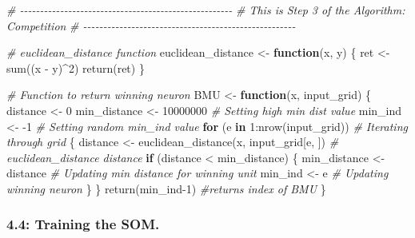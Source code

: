 \documentclass[
]{article}
\newenvironment{Shaded}{\begin{snugshade}}{\end{snugshade}}
\newcommand{\CommentTok}[1]{\textcolor[rgb]{0.56,0.35,0.01}{\textit{#1}}}
\newcommand{\ControlFlowTok}[1]{\textcolor[rgb]{0.13,0.29,0.53}{\textbf{#1}}}
\newcommand{\DecValTok}[1]{\textcolor[rgb]{0.00,0.00,0.81}{#1}}
\newcommand{\FunctionTok}[1]{\textcolor[rgb]{0.00,0.00,0.00}{#1}}
\newcommand{\NormalTok}[1]{#1}
\newcommand{\OtherTok}[1]{\textcolor[rgb]{0.56,0.35,0.01}{#1}}
\newcommand{\SpecialCharTok}[1]{\textcolor[rgb]{0.00,0.00,0.00}{#1}}
\begin{document}
\begin{Shaded}
\begin{Highlighting}[]
\CommentTok{\# {-}{-}{-}{-}{-}{-}{-}{-}{-}{-}{-}{-}{-}{-}{-}{-}{-}{-}{-}{-}{-}{-}{-}{-}{-}{-}{-}{-}{-}{-}{-}{-}{-}{-}{-}{-}{-}{-}{-}{-}{-}{-}{-}{-}{-}{-}{-}{-}{-}{-}{-}{-}{-}}
\CommentTok{\# This is Step 3 of the Algorithm: Competition}
\CommentTok{\# {-}{-}{-}{-}{-}{-}{-}{-}{-}{-}{-}{-}{-}{-}{-}{-}{-}{-}{-}{-}{-}{-}{-}{-}{-}{-}{-}{-}{-}{-}{-}{-}{-}{-}{-}{-}{-}{-}{-}{-}{-}{-}{-}{-}{-}{-}{-}{-}{-}{-}{-}{-}{-}}

\CommentTok{\# euclidean\_distance function}
\NormalTok{euclidean\_distance }\OtherTok{\textless{}{-}} \ControlFlowTok{function}\NormalTok{(x, y) \{}
\NormalTok{  ret }\OtherTok{\textless{}{-}} \FunctionTok{sum}\NormalTok{((x }\SpecialCharTok{{-}}\NormalTok{ y)}\SpecialCharTok{\^{}}\DecValTok{2}\NormalTok{)}
  \FunctionTok{return}\NormalTok{(ret)}
\NormalTok{\}}

\CommentTok{\# Function to return winning neuron}
\NormalTok{BMU }\OtherTok{\textless{}{-}} \ControlFlowTok{function}\NormalTok{(x, input\_grid) \{ }
\NormalTok{  distance }\OtherTok{\textless{}{-}} \DecValTok{0}
\NormalTok{  min\_distance }\OtherTok{\textless{}{-}} \DecValTok{10000000} \CommentTok{\# Setting high min dist value}
\NormalTok{  min\_ind }\OtherTok{\textless{}{-}} \SpecialCharTok{{-}}\DecValTok{1} \CommentTok{\# Setting random min\_ind value}
  \ControlFlowTok{for}\NormalTok{ (e }\ControlFlowTok{in} \DecValTok{1}\SpecialCharTok{:}\FunctionTok{nrow}\NormalTok{(input\_grid)) }\CommentTok{\# Iterating through grid}
\NormalTok{  \{}
\NormalTok{    distance }\OtherTok{\textless{}{-}} \FunctionTok{euclidean\_distance}\NormalTok{(x, input\_grid[e, ]) }\CommentTok{\# euclidean\_distance distance}
    \ControlFlowTok{if}\NormalTok{ (distance }\SpecialCharTok{\textless{}}\NormalTok{ min\_distance) \{}
\NormalTok{      min\_distance }\OtherTok{\textless{}{-}}\NormalTok{ distance }\CommentTok{\# Updating min distance for winning unit}
\NormalTok{      min\_ind }\OtherTok{\textless{}{-}}\NormalTok{ e }\CommentTok{\# Updating winning neuron}
\NormalTok{    \}}
\NormalTok{  \}}
  \FunctionTok{return}\NormalTok{(min\_ind}\DecValTok{{-}1}\NormalTok{) }\CommentTok{\#returns index of BMU}
\NormalTok{\}}
\end{Highlighting}
\end{Shaded}

\hypertarget{training-the-som.}{%
\subsubsection{4.4: Training the SOM.}\label{training-the-som.}}
\end{document}
